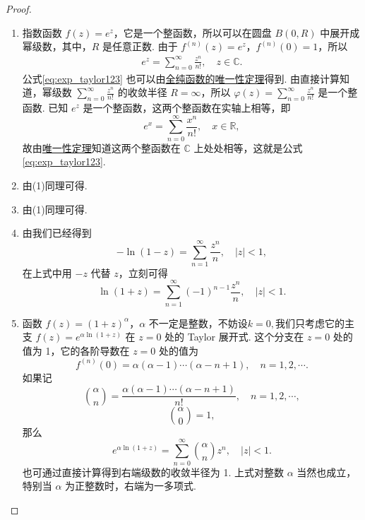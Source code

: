 \documentclass[../../main.tex]{subfiles}%
\begin{document}
\begin{proof}
\begin{enumerate}[(1)]
\item 指数函数 \( f(z) = e^z \)，它是一个整函数，所以可以在圆盘 \( B(0,R) \) 中展开成幂级数，其中，\( R \) 是任意正数. 由于 \( f^{(n)}(z) = e^z \)，\( f^{(n)}(0) = 1 \)，所以
\begin{align}
e^z = \sum_{n=0}^{\infty} \frac{z^n}{n!}, \quad z \in \mathbb{C}. \label{eq:exp_taylor123}
\end{align}
公式\eqref{eq:exp_taylor123} 也可以由\hyperref[theorem:复变函数--唯一性定理]{全纯函数的唯一性定理}得到. 由直接计算知道，幂级数 \( \sum_{n=0}^{\infty} \frac{z^n}{n!} \) 的收敛半径 \( R = \infty \)，所以 \( \varphi(z) = \sum_{n=0}^{\infty} \frac{z^n}{n!} \) 是一个整函数. 已知 \( e^z \) 是一个整函数，这两个整函数在实轴上相等，即
\[
e^x = \sum_{n=0}^{\infty} \frac{x^n}{n!}, \quad x \in \mathbb{R},
\]
故由\hyperref[theorem:复变函数--唯一性定理]{唯一性定理}知道这两个整函数在 \( \mathbb{C} \) 上处处相等，这就是公式 \eqref{eq:exp_taylor123}.

\item 由(1)同理可得.

\item 由(1)同理可得.

\item 由我们已经得到
\[
- \ln(1 - z) = \sum_{n=1}^{\infty} \frac{z^n}{n}, \quad |z| < 1,
\]
在上式中用 \( -z \) 代替 \( z \)，立刻可得
\[
\ln(1 + z) = \sum_{n=1}^{\infty} (-1)^{n - 1} \frac{z^n}{n}, \quad |z| < 1.
\]

\item 函数 \( f(z) = (1 + z)^{\alpha} \)，\( \alpha \) 不一定是整数，不妨设$k=0,$我们只考虑它的主支 \( f(z) = e^{\alpha \ln(1 + z)} \) 在 \( z = 0 \) 处的 Taylor 展开式. 这个分支在 \( z = 0 \) 处的值为 1，它的各阶导数在 \( z = 0 \) 处的值为
\[
f^{(n)}(0) = \alpha(\alpha - 1) \cdots (\alpha - n + 1), \quad n = 1, 2, \cdots.
\]
如果记
\[
\binom{\alpha}{n} = \frac{\alpha(\alpha - 1) \cdots (\alpha - n + 1)}{n!}, \quad n = 1, 2, \cdots,
\]
\[
\binom{\alpha}{0} = 1,
\]
那么
\[
e^{\alpha \ln(1 + z)} = \sum_{n=0}^{\infty} \binom{\alpha}{n} z^n, \quad |z| < 1.
\]
也可通过直接计算得到右端级数的收敛半径为 1. 上式对整数 \( \alpha \) 当然也成立，特别当 \( \alpha \) 为正整数时，右端为一多项式.
\end{enumerate}
\end{proof}
\end{document}
